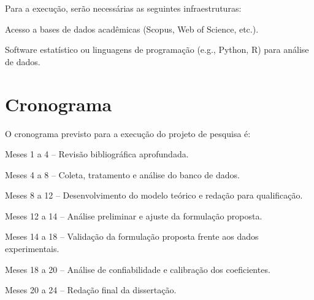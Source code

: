 \documentclass[
	12pt,				%
	openright,			%
	twoside,			%
	a4paper,			%
	chapter=TITLE,		%
	section=TITLE,		%
	subsection=TITLE,	%
	subsubsection=TITLE,%
	partnum=false,
	brazil,			%
]{abntex2}
\begin{document}
Para a execução, serão necessárias as seguintes infraestruturas:
\begin{alineas}
    \item Acesso a bases de dados acadêmicas (Scopus, Web of Science, etc.).
    \item Software estatístico ou linguagens de programação (e.g., Python, R) para análise de dados.
\end{alineas}

\chapter{Cronograma}

O cronograma previsto para a execução do projeto de pesquisa é:
\begin{alineas}
    \item Meses 1 a 4 – Revisão bibliográfica aprofundada.
    \item Meses 4 a 8 – Coleta, tratamento e análise do banco de dados.
    \item Meses 8 a 12 – Desenvolvimento do modelo teórico e redação para qualificação.
    \item Meses 12 a 14 – Análise preliminar e ajuste da formulação proposta.
    \item Meses 14 a 18 – Validação da formulação proposta frente aos dados experimentais.
    \item Meses 18 a 20 – Análise de confiabilidade e calibração dos coeficientes.
    \item Meses 20 a 24 – Redação final da dissertação.
\end{alineas}
\end{document}
